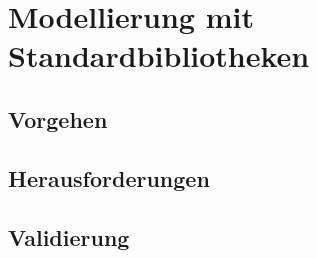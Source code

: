 \chapter{Modellierung mit Standardbibliotheken}
\label{ch:modellierung}

\section{Vorgehen}

\section{Herausforderungen}
%

\section{Validierung}
